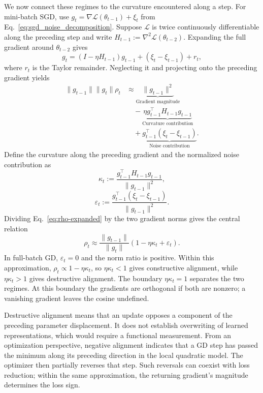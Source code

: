 We now connect these regimes to the curvature encountered along a step.
For mini-batch SGD, use
$g_t=\nabla\mathcal L(\theta_{t-1})+\xi_t$ from
Eq.~\eqref{eq:sgd_noise_decomposition}. Suppose $\mathcal L$ is twice
continuously differentiable along the preceding step and write
$H_{t-1}:=\nabla^2\mathcal L(\theta_{t-2})$.
Expanding the full gradient around $\theta_{t-2}$ gives
\begin{equation}
  g_t=(I-\eta H_{t-1})g_{t-1}+(\xi_t-\xi_{t-1})+r_t,
  \label{eq:gradient-evolution}
\end{equation}
where $r_t$ is the Taylor remainder. Neglecting it and projecting onto
the preceding gradient yields
\begin{equation}
\begin{aligned}
\|g_{t-1}\|\|g_t\|\rho_t
 &\approx\underbrace{\|g_{t-1}\|^2}_{\text{Gradient magnitude}}\\
 &\quad-\underbrace{\eta g_{t-1}^{\top}H_{t-1}g_{t-1}}_{\text{Curvature contribution}}\\
 &\quad+\underbrace{g_{t-1}^{\top}(\xi_t-\xi_{t-1})}_{\text{Noise contribution}}.
\end{aligned}
\label{eq:rho-expanded}
\end{equation}
Define the curvature along the preceding gradient and the normalized
noise contribution as
\begin{equation}
  \kappa_t:=\frac{g_{t-1}^\top H_{t-1}g_{t-1}}{\|g_{t-1}\|^2},
  \label{eq:kappa}
\end{equation}
\begin{equation}
  \varepsilon_t:=
  \frac{g_{t-1}^\top(\xi_t-\xi_{t-1})}{\|g_{t-1}\|^2}.
  \label{eq:epsilon}
\end{equation}
Dividing Eq.~\eqref{eq:rho-expanded} by the two gradient norms gives
the central relation
\begin{equation}
  \boxed{\rho_t\approx\frac{\|g_{t-1}\|}{\|g_t\|}
                   (1-\eta\kappa_t+\varepsilon_t).}
  \label{eq:rho-normalized}
\end{equation}
In full-batch GD, $\varepsilon_t=0$ and the norm ratio is positive.
Within this approximation, $\rho_t\propto1-\eta\kappa_t$, so
$\eta\kappa_t<1$ gives constructive alignment, while $\eta\kappa_t>1$
gives destructive alignment. The boundary $\eta\kappa_t=1$ separates
the two regimes. At this boundary the gradients are orthogonal if
both are nonzero; a vanishing gradient leaves the cosine undefined.

Destructive alignment means that an update opposes a component of the
preceding parameter displacement. It does not establish overwriting of
learned representations, which would require a functional measurement.
From an optimization perspective, negative alignment indicates
that a GD step has passed the minimum along its preceding direction in
the local quadratic model. The optimizer then partially reverses that
step. Such reversals can coexist with loss reduction; within the same
approximation, the returning gradient's magnitude determines the loss sign.

